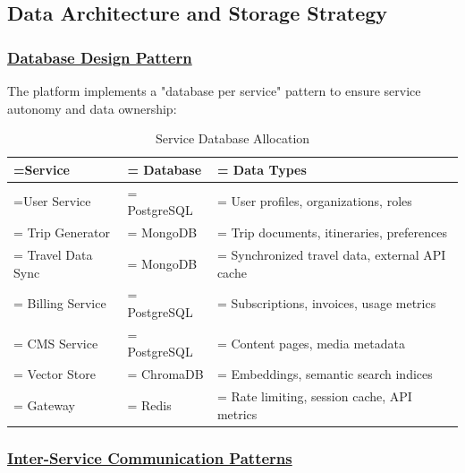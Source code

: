 \subsection{Data Architecture and Storage Strategy}

\subsubsection*{\underline{Database Design Pattern}}
The platform implements a "database per service" pattern to ensure service autonomy and data ownership:

\begin{table}[H]
    \renewcommand{\arraystretch}{1.3}
    \caption{Service Database Allocation}
    \centering
    \medskip
    \begin{tabularx}{1\textwidth} {
            | >{\hsize=0.6\hsize\linewidth=\hsize\centering\arraybackslash}X
            | >{\hsize=0.7\hsize\linewidth=\hsize\centering\arraybackslash}X
            | >{\hsize=0.7\hsize\linewidth=\hsize\justifying\arraybackslash}X |}
        \hline
        \textbf{Service} & \textbf{Database} & \textbf{Data Types}                          \\
        \hline
        User Service     & PostgreSQL        & User profiles, organizations, roles          \\
        \hline
        Trip Generator   & MongoDB           & Trip documents, itineraries, preferences     \\
        \hline
        Travel Data Sync & MongoDB           & Synchronized travel data, external API cache \\
        \hline
        Billing Service  & PostgreSQL        & Subscriptions, invoices, usage metrics       \\
        \hline
        CMS Service      & PostgreSQL        & Content pages, media metadata                \\
        \hline
        Vector Store     & ChromaDB          & Embeddings, semantic search indices          \\
        \hline
        Gateway          & Redis             & Rate limiting, session cache, API metrics    \\
        \hline
    \end{tabularx}
\end{table}

\subsubsection*{\underline{Inter-Service Communication Patterns}}

